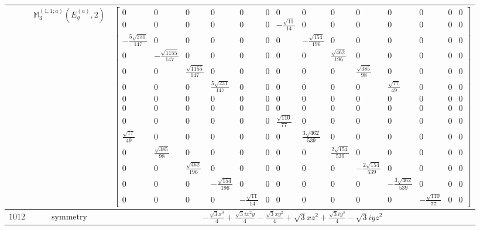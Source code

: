 \documentclass[fleqn,8pt,landscape]{jsarticle}
\begin{document}
\begin{longtable}{ccc}
$  $ & $ \mathbb{M}_{3}^{(1,1;a)}(E_{g}^{(a)},2) $ & $ \begin{bmatrix} 0 & 0 & 0 & 0 & 0 & 0 & 0 & 0 & 0 & 0 & 0 & 0 & 0 & 0 \\ 0 & 0 & 0 & 0 & 0 & 0 & - \frac{\sqrt{11}}{14} & 0 & 0 & 0 & 0 & 0 & 0 & 0 \\ - \frac{5 \sqrt{231}}{147} & 0 & 0 & 0 & 0 & 0 & 0 & - \frac{\sqrt{154}}{196} & 0 & 0 & 0 & 0 & 0 & 0 \\ 0 & - \frac{\sqrt{1155}}{147} & 0 & 0 & 0 & 0 & 0 & 0 & \frac{\sqrt{462}}{196} & 0 & 0 & 0 & 0 & 0 \\ 0 & 0 & \frac{\sqrt{1155}}{147} & 0 & 0 & 0 & 0 & 0 & 0 & \frac{\sqrt{385}}{98} & 0 & 0 & 0 & 0 \\ 0 & 0 & 0 & \frac{5 \sqrt{231}}{147} & 0 & 0 & 0 & 0 & 0 & 0 & \frac{\sqrt{77}}{49} & 0 & 0 & 0 \\ 0 & 0 & 0 & 0 & 0 & 0 & 0 & 0 & 0 & 0 & 0 & 0 & 0 & 0 \\ 0 & 0 & 0 & 0 & 0 & 0 & 0 & 0 & 0 & 0 & 0 & 0 & 0 & 0 \\ 0 & 0 & 0 & 0 & 0 & 0 & \frac{\sqrt{110}}{77} & 0 & 0 & 0 & 0 & 0 & 0 & 0 \\ \frac{\sqrt{77}}{49} & 0 & 0 & 0 & 0 & 0 & 0 & \frac{3 \sqrt{462}}{539} & 0 & 0 & 0 & 0 & 0 & 0 \\ 0 & \frac{\sqrt{385}}{98} & 0 & 0 & 0 & 0 & 0 & 0 & \frac{2 \sqrt{154}}{539} & 0 & 0 & 0 & 0 & 0 \\ 0 & 0 & \frac{\sqrt{462}}{196} & 0 & 0 & 0 & 0 & 0 & 0 & - \frac{2 \sqrt{154}}{539} & 0 & 0 & 0 & 0 \\ 0 & 0 & 0 & - \frac{\sqrt{154}}{196} & 0 & 0 & 0 & 0 & 0 & 0 & - \frac{3 \sqrt{462}}{539} & 0 & 0 & 0 \\ 0 & 0 & 0 & 0 & - \frac{\sqrt{11}}{14} & 0 & 0 & 0 & 0 & 0 & 0 & - \frac{\sqrt{110}}{77} & 0 & 0 \end{bmatrix} $ \\ \hline
$ 1012 $ & $ \text{symmetry} $ & $ - \frac{\sqrt{3} x^{3}}{4} + \frac{\sqrt{3} i x^{2} y}{4} - \frac{\sqrt{3} x y^{2}}{4} + \sqrt{3} x z^{2} + \frac{\sqrt{3} i y^{3}}{4} - \sqrt{3} i y z^{2} $ \\

\end{longtable}
\end{document}
